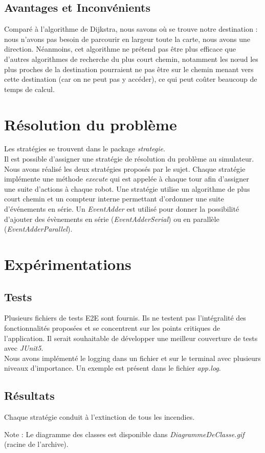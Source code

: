 \documentclass[a4paper, 10pt, french]{article}
\begin{document}
	\subsection{Avantages et Inconvénients}

	Comparé à l'algorithme de Dijkstra, nous savons où se trouve notre destination : nous n'avons pas besoin de parcourir en largeur toute la carte, nous avons une direction. Néanmoins, cet algorithme ne prétend pas être plus efficace que d'autres algorithmes de recherche du plus court chemin, notamment les nœud les plus proches de la destination pourraient ne pas être sur le chemin menant vers cette destination (car on ne peut pas y accéder), ce qui peut coûter beaucoup de temps de calcul.

\section{Résolution du problème}
	\noindent Les stratégies se trouvent dans le package {\it strategie}. \\

	Il est possible d'assigner une stratégie de résolution du problème au simulateur. Nous avons réalisé les deux stratégies proposés par le sujet. Chaque stratégie implémente une méthode {\it execute} qui est appelée à chaque tour afin d'assigner une suite d'actions à chaque robot. Une stratégie utilise un algorithme de plus court chemin et un compteur interne permettant d'ordonner une suite d'événements en série. Un {\it EventAdder} est utilisé pour donner la possibilité d'ajouter des évènements en série ({\it EventAdderSerial}) ou en parallèle ({\it EventAdderParallel}).

\section{Expérimentations}

	\subsection{Tests}
	Plusieurs fichiers de tests E2E sont fournis. Ils ne testent pas l'intégralité des fonctionnalités proposées et se concentrent sur les points critiques de l'application. Il serait souhaitable de développer une meilleur couverture de tests avec {\it JUnit5}. \\

	Nous avons implémenté le logging dans un fichier et sur le terminal avec plusieurs niveaux d'importance. Un exemple est présent dans le fichier {\it app.log}.

	\subsection{Résultats}
	Chaque stratégie conduit à l'extinction de tous les incendies.
	\par\leavevmode\par
	Note : Le diagramme des classes est disponible dans {\it DiagrammeDeClasse.gif} (racine de l'archive).
\end{document}
